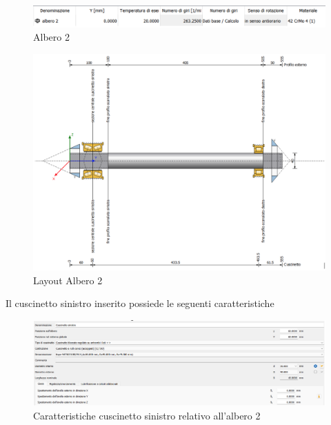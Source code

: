 \begin{figure}[h]
    \centering
    \includegraphics[scale=0.4]{Immagini/DatiAlbero2.png}
    \caption{Albero  2}
    \label{fig:DatiAlbero2}
\end{figure}
\newpage
\begin{figure}[h]
    \centering
    \includegraphics[scale=0.45]{Immagini/Albero2.png}
    \caption{Layout Albero 2}
    \label{fig:Albero2}
\end{figure}
\newpage

Il cuscinetto sinistro inserito possiede le seguenti caratteristiche
\begin{figure}[h]
    \centering
    \includegraphics[scale=0.45]{Immagini/CuscinettoSinistraAlbero2.png}
    \caption{Caratteristiche cuscinetto sinistro relativo all'albero 2}
    \label{fig:CuscinettoSinsitraAlbero2}
\end{figure}


